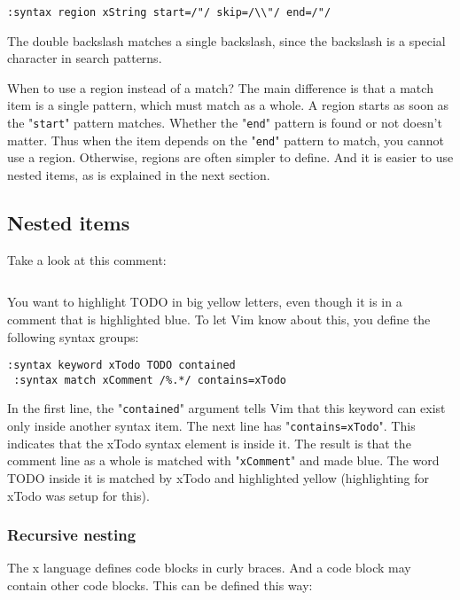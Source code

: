 \begin{Verbatim}[samepage=true]
 :syntax region xString start=/"/ skip=/\\"/ end=/"/
\end{Verbatim}

The double backslash matches a single backslash, since the backslash is a special character in search patterns.

When to use a region instead of a match?
The main difference is that a match item is a single pattern, which must match as a whole.
A region starts as soon as the "\texttt{start}" pattern matches.
Whether the "\texttt{end}" pattern is found or not doesn't matter.
Thus when the item depends on the "\texttt{end}" pattern to match, you cannot use a region.
Otherwise, regions are often simpler to define.
And it is easier to use nested items, as is explained in the next section.
\subsection{Nested items}
Take a look at this comment:

\begin{Verbatim}[samepage=true]
    %Get input  TODO: Skip white space 
\end{Verbatim}

You want to highlight TODO in big yellow letters, even though it is in a comment that is highlighted blue.
To let Vim know about this, you define the following syntax groups:

\begin{Verbatim}[samepage=true]
 :syntax keyword xTodo TODO contained
 :syntax match xComment /%.*/ contains=xTodo
\end{Verbatim}

In the first line, the "\texttt{contained}" argument tells Vim that this keyword can exist only inside another syntax item.
The next line has "\texttt{contains=xTodo}".
This indicates that the xTodo syntax element is inside it.
The result is that the comment line as a whole is matched with "\texttt{xComment}" and made blue.
The word TODO inside it is matched by xTodo and highlighted yellow (highlighting for xTodo was setup for this).

\subsubsection{Recursive nesting}
The x language defines code blocks in curly braces.
And a code block may contain other code blocks.
This can be defined this way:

